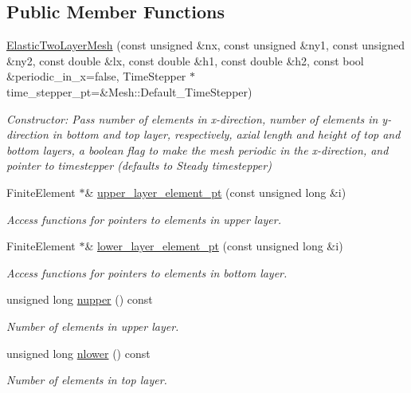 \subsection*{Public Member Functions}
\begin{DoxyCompactItemize}
\item 
\hyperlink{classElasticTwoLayerMesh_a720be7cd7b0f44df04dcb0d09a2795a7}{Elastic\+Two\+Layer\+Mesh} (const unsigned \&nx, const unsigned \&ny1, const unsigned \&ny2, const double \&lx, const double \&h1, const double \&h2, const bool \&periodic\+\_\+in\+\_\+x=false, Time\+Stepper $\ast$time\+\_\+stepper\+\_\+pt=\&Mesh\+::\+Default\+\_\+\+Time\+Stepper)
\begin{DoxyCompactList}\small\item\em Constructor\+: Pass number of elements in x-\/direction, number of elements in y-\/direction in bottom and top layer, respectively, axial length and height of top and bottom layers, a boolean flag to make the mesh periodic in the x-\/direction, and pointer to timestepper (defaults to Steady timestepper) \end{DoxyCompactList}\item 
Finite\+Element $\ast$\& \hyperlink{classElasticTwoLayerMesh_ab5b2682b701b796c14431f8e126457fd}{upper\+\_\+layer\+\_\+element\+\_\+pt} (const unsigned long \&i)
\begin{DoxyCompactList}\small\item\em Access functions for pointers to elements in upper layer. \end{DoxyCompactList}\item 
Finite\+Element $\ast$\& \hyperlink{classElasticTwoLayerMesh_a4e6d9b26eecc0487d7b2684ad27b7669}{lower\+\_\+layer\+\_\+element\+\_\+pt} (const unsigned long \&i)
\begin{DoxyCompactList}\small\item\em Access functions for pointers to elements in bottom layer. \end{DoxyCompactList}\item 
unsigned long \hyperlink{classElasticTwoLayerMesh_ae5c586ecab2ac275174427a94ccfc0c7}{nupper} () const
\begin{DoxyCompactList}\small\item\em Number of elements in upper layer. \end{DoxyCompactList}\item 
unsigned long \hyperlink{classElasticTwoLayerMesh_a144f4d44005a25bb301955625a79c9ef}{nlower} () const
\begin{DoxyCompactList}\small\item\em Number of elements in top layer. \end{DoxyCompactList}\item 

\end{DoxyCompactItemize}

